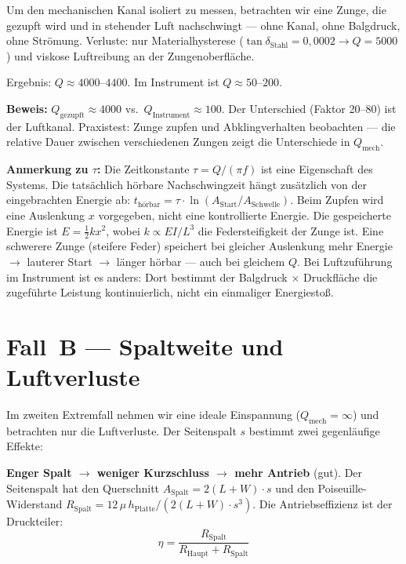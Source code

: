 \documentclass[11pt,a4paper]{article}
\begin{document}
Um den mechanischen Kanal isoliert zu messen, betrachten wir eine Zunge, die gezupft wird und in stehender Luft nachschwingt --- ohne Kanal, ohne Balgdruck, ohne Strömung. Verluste: nur Materialhysterese ($\tan\delta_\text{Stahl} = 0{,}0002 \to Q = 5000$) und viskose Luftreibung an der Zungenoberfläche.

Ergebnis: $Q \approx 4000$--$4400$. Im Instrument ist $Q \approx 50$--$200$.

\begin{keybox}
\textbf{Beweis:} $Q_\text{gezupft} \approx 4000$ vs.\ $Q_\text{Instrument} \approx 100$. Der Unterschied (Faktor 20--80) ist der Luftkanal. Praxistest: Zunge zupfen und Abklingverhalten beobachten --- die relative Dauer zwischen verschiedenen Zungen zeigt die Unterschiede in $Q_\text{mech}$.
\end{keybox}

\textbf{Anmerkung zu $\tau$:} Die Zeitkonstante $\tau = Q/(\pi f)$ ist eine Eigenschaft des Systems. Die tatsächlich hörbare Nachschwingzeit hängt zusätzlich von der eingebrachten Energie ab: $t_\text{hörbar} = \tau \cdot \ln(A_\text{Start}/A_\text{Schwelle})$. Beim Zupfen wird eine Auslenkung $x$ vorgegeben, nicht eine kontrollierte Energie. Die gespeicherte Energie ist $E = \tfrac{1}{2} k x^2$, wobei $k \propto EI/L^3$ die Federsteifigkeit der Zunge ist. Eine schwerere Zunge (steifere Feder) speichert bei gleicher Auslenkung mehr Energie $\to$ lauterer Start $\to$ länger hörbar --- auch bei gleichem $Q$. Bei Luftzuführung im Instrument ist es anders: Dort bestimmt der Balgdruck $\times$ Druckfläche die zugeführte Leistung kontinuierlich, nicht ein einmaliger Energiestoß.

\section{Fall~B --- Spaltweite und Luftverluste}

Im zweiten Extremfall nehmen wir eine ideale Einspannung ($Q_\text{mech} = \infty$) und betrachten nur die Luftverluste. Der Seitenspalt $s$ bestimmt zwei gegenläufige Effekte:

\textbf{Enger Spalt $\to$ weniger Kurzschluss $\to$ mehr Antrieb} (gut). Der Seitenspalt hat den Querschnitt $A_\text{Spalt} = 2(L+W) \cdot s$ und den Poiseuille-Widerstand $R_\text{Spalt} = 12\,\mu\, h_\text{Platte} / (2(L+W) \cdot s^3)$. Die Antriebseffizienz ist der Druckteiler:
\begin{equation}
\eta = \frac{R_\text{Spalt}}{R_\text{Haupt} + R_\text{Spalt}}
\end{equation}
\end{document}
